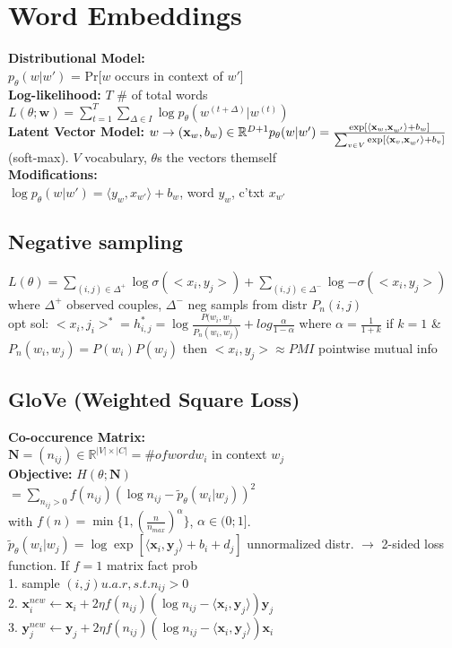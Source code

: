 \section{Word Embeddings}
\textbf{Distributional Model:}\\
$p_\theta(w|w')$ = Pr[$w$ occurs in context of $w'$]\\
\textbf{Log-likelihood:} $T$ \# of total words\\
$L(\theta; \mathbf{w}) = \sum_{t=1}^T\sum_{\Delta \in I}{\log p_\theta(w^{(t+\Delta)}|w^{(t)})}$\\
\textbf{Latent Vector Model:} $w \rightarrow (\mathbf{x}_w, b_w) \in \mathbb{R}^{D+1} \\p_{\theta}(w|w') = \frac{\exp[\langle \mathbf{x}_w,\mathbf{x}_{w'}\rangle + b_w]}{\sum_{v\in V}{\exp[\langle \mathbf{x}_v,\mathbf{x}_{w'}\rangle + b_v ]}}$ (soft-max). 
$V$ vocabulary, $\theta$s the vectors themself\\
\textbf{Modifications:}\\
$\log p_{\theta}(w|w') = \langle  y_{w} , x_{w'} \rangle + b_w$,  word $y_w$, c'txt $x_{w'}$\\

\subsection*{Negative sampling}
$L(\theta) = \sum_{(i,j) \in \Delta^+}{\log{\sigma(<x_i, y_j>)}} + \sum_{(i,j) \in \Delta^-}{\log {-\sigma(<x_i, y_j>)}}$ where $\Delta^+$ observed couples, $\Delta^-$ neg sampls from distr $P_n(i,j)$\\
opt sol: $<x_i,j_i>^* = h_{i,j}^* = \log{\frac{P(w_i,w_j}{P_n(w_i,w_j)}} + log{\frac{\alpha}{1 - \alpha}}$ where $\alpha = \frac{1}{1+k}$ if $k=1$ \& $P_n(w_i,w_j)=P(w_i)P(w_j)$ then $<x_i,y_j> \approx PMI$ pointwise mutual info


\subsection*{GloVe (Weighted Square Loss)}
\textbf{Co-occurence Matrix:}\\
$\mathbf{N} = (n_{ij}) \in \mathbb{R}^{|V|\times|C|} = \# of word w_i$ in context $w_j$\\
\textbf{Objective:} $H(\theta;\mathbf{N})$\\
$= \sum_{n_{ij} > 0} f(n_{ij})(\log n_{ij} - \tilde{p}_\theta(w_i | w_j))^2$\\
with $f(n) = \min\{1, (\frac{n}{n_{max}})^\alpha\}$, $\alpha \in (0;1]$.\\
$\tilde{p}_\theta(w_i | w_j) = \log \exp[\langle \mathbf{x}_i, \mathbf{y}_j \rangle + b_i + d_j]$ unnormalized distr. $\rightarrow$ 2-sided loss function. If $f=1$ matrix fact prob\\
1. sample $(i,j) u.a.r, s.t. n_{ij}>0$\\
2. $\mathbf{x}_i^{new} \leftarrow \mathbf{x}_i + 2\eta f(n_{ij})(\log n_{ij} - \langle \mathbf{x}_i, \mathbf{y}_j \rangle)\mathbf{y}_j$\\
3. $\mathbf{y}_j^{new} \leftarrow \mathbf{y}_j + 2\eta f(n_{ij})(\log n_{ij} - \langle \mathbf{x}_i, \mathbf{y}_j \rangle)\mathbf{x}_i$
